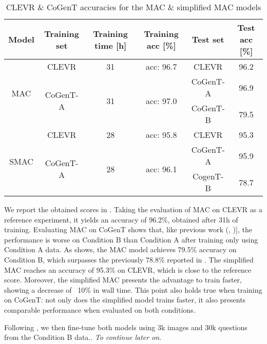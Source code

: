 \begin{table}[]
	\caption{CLEVR \& CoGenT accuracies for the MAC \& simplified MAC models}
	\centering
	\begin{tabular}{cccccc}
		\toprule
		Model                 & Training set                & Training time [h] & Training acc [\%]          & Test set & Test acc [\%] \\
		\midrule
		\multirow{3}{*}{MAC}  & CLEVR                       & 31                                   & acc: 96.7                  & CLEVR    & 96.2          \\
		\cmidrule{2-6} 
		& \multirow{2}{*}{CoGenT-A} & \multirow{2}{*}{31}                    & \multirow{2}{*}{acc: 97.0} & CoGenT-A & 96.9         \\
		\cmidrule{5-6} 
		&                             &                                         &                              & CoGenT-B & 79.5          \\
		\midrule
		\multirow{3}{*}{SMAC} & CLEVR                       & 28                                     & acc: 95.8               & CLEVR    & 95.3          \\
		\cmidrule{2-6} 
		& \multirow{2}{*}{CoGenT-A}   & \multirow{2}{*}{28}                    & \multirow{2}{*}{acc: 96.1} & CoGenT-A & 95.9          \\
		\cmidrule{5-6} 
		&                             &                                         &                              & CogenT-B & 78.7          \\
		\bottomrule
	\end{tabular}
	\label{results}
\end{table}

We report the obtained scores in . Taking the evaluation of MAC on CLEVR as a reference experiment, it yields an accuracy of 96.2\%, obtained after 31h of training.
Evaluating MAC on CoGenT shows that, like previous work (\cite{johnson2017inferring}, \cite{mascharka2018transparency})], the performance is worse on Condition B than Condition A after training only using Condition A data. As  shows, the MAC model achieves 79.5\% accuracy on Condition B, which surpasses the previously 78.8\% reported in \cite{perez2017film}. 
The simplified MAC reaches an accuracy of 95.3\% on CLEVR, which is close to the reference score. Moreover, the simplified MAC presents the advantage to train faster, showing a decrease of ~10\% in wall time. This point also holds true when training on CoGenT: not only does the simplified model trains faster, it also presents comparable performance when evaluated on both conditions.


Following \cite{johnson2017inferring}, we then fine-tune both models using 3k images and 30k questions from the Condition B data.. \textit{To continue later on}.
